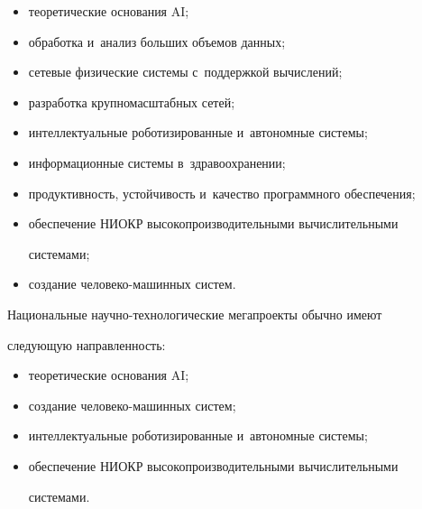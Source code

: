      \begin{itemize}


\item теоретические основания AI;


\item обработка и~анализ больших объемов данных;


\item сетевые физические системы с~поддержкой вычислений;


\item разработка крупномасштабных сетей;


\item интеллектуальные роботизированные и~автономные системы;


\item информационные системы в~здравоохранении;


\item продуктивность, устой\-чи\-вость и~качество программного обеспечения;


\item обеспечение НИОКР высокопроизводительными вы\-чис\-ли\-тель\-ны\-ми 


сис\-те\-мами;


\item создание человеко-машинных систем.


\end{itemize}


     


     Национальные научно-технологические мегапроекты обычно имеют 


сле\-ду\-ющую на\-прав\-лен\-ность:


     \begin{itemize}


\item теоретические основания AI;


\item создание человеко-ма\-шин\-ных сис\-тем;


\item интеллектуальные роботизированные и~автономные сис\-те\-мы;


\item обеспечение НИОКР высокопроизводительными вычислительными  


сис\-те\-мами.


\end{itemize}


     


